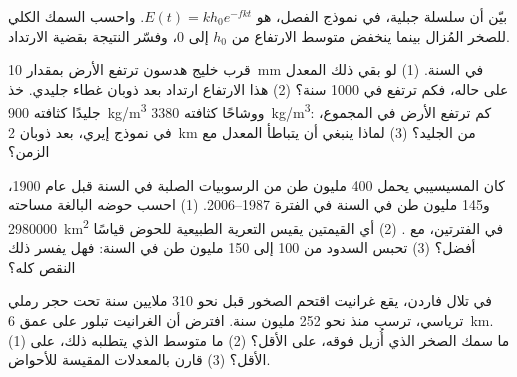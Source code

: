 \begin{exercise}[$\star\star\star$]\label{exo:g12:destruction-of-mountains:12}
بيّن أن  سلسلة جبلية، في نموذج الفصل، هو
$E(t) = k h_0 e^{-fkt}$. واحسب السمك الكلي للصخر المُزال بينما
ينخفض متوسط الارتفاع من $h_0$ إلى 0، وفسّر النتيجة بقضية
الارتداد.
\end{exercise}

\begin{exercise}[$\star\star\star$]\label{exo:g12:destruction-of-mountains:13}
قرب خليج هدسون ترتفع الأرض بمقدار \qty{10}{mm} في السنة. (1) لو بقي ذلك المعدل
على حاله، فكم ترتفع في 1000 سنة؟ (2) هذا الارتفاع
ارتداد بعد ذوبان غطاء جليدي. خذ جليدًا كثافته
\qty{900}{kg/m^3} ووشاحًا كثافته \qty{3380}{kg/m^3}: كم ترتفع
الأرض في المجموع، في نموذج إيري، بعد ذوبان \qty{2}{km} من الجليد؟
(3) لماذا ينبغي أن يتباطأ المعدل مع الزمن؟
\end{exercise}

\begin{exercise}[$\star\star\star$]\label{exo:g12:destruction-of-mountains:14}
كان المسيسيبي يحمل 400 مليون طن من الرسوبيات الصلبة في السنة قبل
عام 1900، و145 مليون طن في السنة في الفترة 1987--2006. (1) احسب
 حوضه البالغة مساحته \qty{2980000}{km^2} في الفترتين، مع
. (2) أي القيمتين يقيس التعرية الطبيعية
للحوض قياسًا أفضل؟ (3) تحبس السدود من 100 إلى 150 مليون طن في السنة: فهل يفسر ذلك
النقص كله؟
\end{exercise}

\begin{exercise}[$\star\star\star$]\label{exo:g12:destruction-of-mountains:15}
في تلال فاردن، يقع غرانيت اقتحم الصخور قبل نحو 310 ملايين سنة
تحت حجر رملي ترياسي، ترسب منذ نحو 252 مليون سنة.
افترض أن الغرانيت تبلور على عمق \qty{6}{km}. (1) ما سمك الصخر
الذي أُزيل فوقه، على الأقل؟ (2) ما متوسط  الذي يتطلبه
ذلك، على الأقل؟ (3) قارن بالمعدلات المقيسة للأحواض.
\end{exercise}

